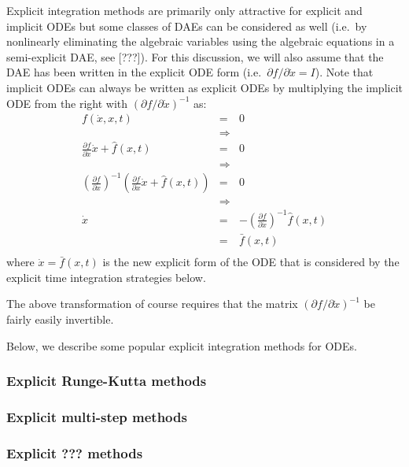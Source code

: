 \documentclass[pdf,ps2pdf,11pt]{SANDreport}
\begin{document}
Explicit integration methods are primarily only attractive for explicit and
implicit ODEs but some classes of DAEs can be considered as well (i.e.\ by
nonlinearly eliminating the algebraic variables using the algebraic equations
in a semi-explicit DAE, see [???]).  For this discussion, we will also assume
that the DAE has been written in the explicit ODE form (i.e.\ ${}\partial f /
{}\partial {}\dot{x} = I$).  Note that implicit ODEs can always be written as
explicit ODEs by multiplying the implicit ODE from the right with $({}\partial
f / {}\partial {}\dot{x})^{-1}$ as:
%
\begin{eqnarray*}
f(\dot{x},x,t) & = & 0 \\
& \Rightarrow \\
\frac{\partial f}{\partial \dot{x}} \dot{x} + \hat{f}(x,t) & = & 0 \\
& \Rightarrow \\
\left( \frac{\partial f}{\partial \dot{x}} \right)^{-1}
\left( \frac{\partial f}{\partial \dot{x}} \dot{x} + \hat{f}(x,t) \right) & = & 0 \\
& \Rightarrow \\
\dot{x} & = & -\left( \frac{\partial f}{\partial \dot{x}} \right)^{-1} \hat{f}(x,t) \\
& = & \bar{f}(x,t) \\
\end{eqnarray*}
%
where ${}\dot{x} = \bar{f}(x,t)$ is the new explicit form of the ODE that is
considered by the explicit time integration strategies below.

The above transformation of course requires that the matrix $({}\partial f /
{}\partial {}\dot{x})^{-1}$ be fairly easily invertible.

Below, we describe some popular explicit integration methods for ODEs.

\subsubsection{Explicit Runge-Kutta methods}

\subsubsection{Explicit multi-step methods}

\subsubsection{Explicit ??? methods}
\end{document}
